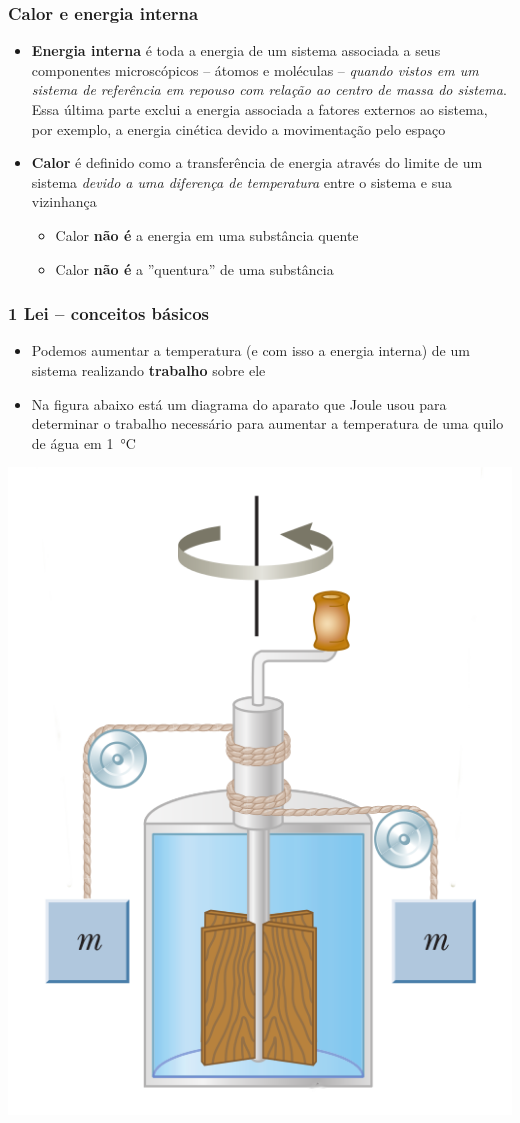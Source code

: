 \documentclass[t,%
brazilian,%
11pt,%
aspectratio=169,%
table%
]{beamer}
\begin{document}
\begin{frame}
    \frametitle{Calor e energia interna}
    \begin{itemize}
        \item \textbf{Energia interna} é toda a energia de um sistema associada
            a seus componentes microscópicos -- átomos e moléculas --
            \textit{quando vistos em um sistema de referência em repouso com
            relação ao centro de massa do sistema}. Essa última parte exclui a
            energia associada a fatores externos ao sistema, por exemplo, a
            energia cinética devido a movimentação pelo espaço

        \item \textbf{Calor} é definido como a transferência de energia através
            do limite de um sistema \textit{devido a uma diferença de
            temperatura} entre o sistema e sua vizinhança

            \begin{itemize}
                \item Calor \textbf{não é} a energia em uma substância quente
                \item Calor \textbf{não é} a ''quentura'' de uma substância
            \end{itemize}
    \end{itemize}
\end{frame}


\begin{frame}
    \frametitle{1\textordfeminine{} Lei -- conceitos básicos}
    \begin{itemize}
        \item Podemos aumentar a temperatura (e com isso a energia interna) de
            um sistema realizando \textbf{trabalho} sobre ele
        \item Na figura abaixo está um diagrama do aparato que Joule usou para
            determinar o trabalho necessário para aumentar a temperatura de uma
            quilo de água em \SI{1}{\celsius}
    \end{itemize}
    \begin{center}
        \includegraphics[width=0.3\textwidth-16pt*\real{0.78}]{images/joule.png}
    \end{center}
\end{frame}
\end{document}
